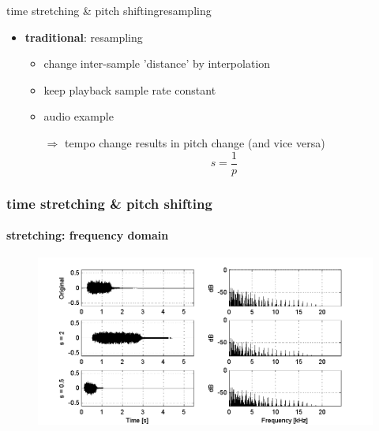     \begin{frame}{time stretching \& pitch shifting}{resampling}
        \begin{itemize}
            \item   \textbf{traditional}: resampling
                \begin{itemize}
                    \item   change inter-sample 'distance' by interpolation
                    \item   keep playback sample rate constant
                    \pause
                    \bigskip
                    \item   audio example
                    \pause
                    \bigskip 
                    \item[$\Rightarrow$] tempo change results in pitch change (and vice versa)
                    \begin{equation*}
                        s = \frac{1}{p}
                    \end{equation*}
                \end{itemize}
        \end{itemize}
    \end{frame}
 
\begin{frame}\frametitle{time stretching \& pitch shifting}\framesubtitle{stretching: frequency domain}
		\begin{figure}
			\centerline{\includegraphics[scale=.7]{graph/fx4_timestretchintro}}
		\end{figure}
\end{frame}
   
